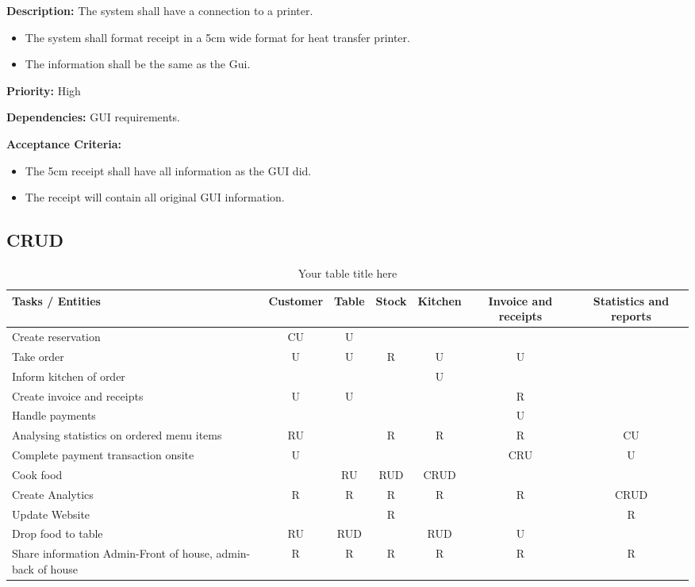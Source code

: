 \documentclass{article}
\begin{document}
\textbf{Description:} The system shall have a connection to a printer.
\begin{itemize}
    \item The system shall format receipt in a 5cm wide format for heat transfer printer.
    \item The information shall be the same as the Gui.
\end{itemize}


\textbf{Priority:} High


\textbf{Dependencies:} GUI requirements.


\textbf{Acceptance Criteria:} \begin{itemize}
    \item The 5cm receipt shall have all information as the GUI did.
    \item The receipt will contain all original GUI information.
\end{itemize}






\clearpage
\subsection{CRUD}

\begin{table}[h!]
  \centering
  \begin{tabular}{|l|c|c|c|c|c|c|}
    \hline
    \textbf{Tasks / Entities} & \textbf{Customer} & \textbf{Table} & \textbf{Stock} & \textbf{Kitchen} & \textbf{Invoice and receipts} & \textbf{Statistics and reports} \\
    \hline
    Create reservation & CU & U & & & & \\
    \hline
    Take order & U & U & R & U & U & \\
    \hline
    Inform kitchen of order & & & & U & & \\
    \hline
    Create invoice and receipts & U & U & & & R & \\
    \hline
    Handle payments & & & & & U & \\
    \hline
    Analysing statistics on ordered menu items & RU & & R & R & R & CU \\
    \hline
    Complete payment transaction onsite & U & & & & CRU & U \\
    \hline
    Cook food & & RU & RUD & CRUD & & \\
    \hline
    Create Analytics & R & R & R & R & R & CRUD \\
    \hline
    Update Website & & & R & & & R \\
    \hline
    Drop food to table & RU & RUD & & RUD & U & \\
    \hline
    Share information Admin-Front of house, admin-back of house & R & R & R & R & R & R \\
    \hline
  \end{tabular}
  \caption{Your table title here}
\end{table}
\end{document}
